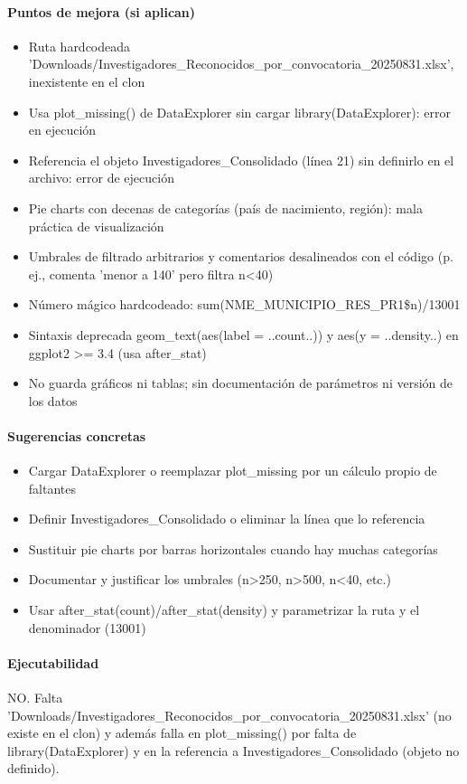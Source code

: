 \paragraph{Puntos de mejora (si aplican)}
\begin{itemize}
  \item Ruta hardcodeada 'Downloads/Investigadores\_Reconocidos\_por\_convocatoria\_20250831.xlsx', inexistente en el clon
  \item Usa plot\_missing() de DataExplorer sin cargar library(DataExplorer): error en ejecución
  \item Referencia el objeto Investigadores\_Consolidado (línea 21) sin definirlo en el archivo: error de ejecución
  \item Pie charts con decenas de categorías (país de nacimiento, región): mala práctica de visualización
  \item Umbrales de filtrado arbitrarios y comentarios desalineados con el código (p. ej., comenta 'menor a 140' pero filtra n<40)
  \item Número mágico hardcodeado: sum(NME\_MUNICIPIO\_RES\_PR1\$n)/13001
  \item Sintaxis deprecada geom\_text(aes(label = ..count..)) y aes(y = ..density..) en ggplot2 >= 3.4 (usa after\_stat)
  \item No guarda gráficos ni tablas; sin documentación de parámetros ni versión de los datos
\end{itemize}

\paragraph{Sugerencias concretas}
\begin{itemize}
  \item Cargar DataExplorer o reemplazar plot\_missing por un cálculo propio de faltantes
  \item Definir Investigadores\_Consolidado o eliminar la línea que lo referencia
  \item Sustituir pie charts por barras horizontales cuando hay muchas categorías
  \item Documentar y justificar los umbrales (n>250, n>500, n<40, etc.)
  \item Usar after\_stat(count)/after\_stat(density) y parametrizar la ruta y el denominador (13001)
\end{itemize}

\paragraph{Ejecutabilidad}
NO. Falta 'Downloads/Investigadores\_Reconocidos\_por\_convocatoria\_20250831.xlsx' (no existe en el clon) y además falla en plot\_missing() por falta de library(DataExplorer) y en la referencia a Investigadores\_Consolidado (objeto no definido).

